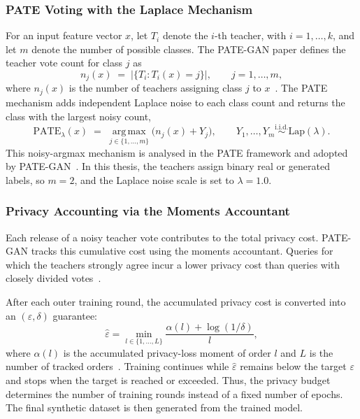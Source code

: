 \subsubsection{PATE Voting with the Laplace Mechanism}
\label{sec:methods:pategan:laplace}

For an input feature vector $x$, let $T_i$ denote the $i$-th teacher,
with $i=1,\dots,k$, and let $m$ denote the number of possible classes.
The PATE-GAN paper defines the teacher vote count for class $j$ as
\begin{equation}
  n_j(x) \;=\; \bigl|\{T_i : T_i(x) = j\}\bigr|,
  \qquad j = 1,\dots,m,
\end{equation}
where $n_j(x)$ is the number of teachers assigning class $j$ to
$x$~\cite{pategan}. The PATE mechanism adds independent Laplace noise to each class count and
returns the class with the largest noisy count,
\begin{equation}
  \mathrm{PATE}_{\lambda}(x)
  \;=\;
  \operatorname*{arg\,max}_{j \in \{1,\dots,m\}}
  \bigl(n_j(x) + Y_j\bigr),
  \qquad
  Y_1,\dots,Y_m \overset{\mathrm{i.i.d.}}{\sim} \mathrm{Lap}(\lambda).
  \label{eq:pategan-aggregation}
\end{equation}
This noisy-argmax mechanism is analysed in the PATE framework and adopted
by PATE-GAN~\cite{Papernot2017PATE,pategan}. In this thesis, the teachers
assign binary real or generated labels, so $m=2$, and the Laplace noise
scale is set to $\lambda=1.0$.

\subsubsection{Privacy Accounting via the Moments Accountant}
\label{sec:methods:pategan:accountant}

Each release of a noisy teacher vote contributes to the total privacy cost.
PATE-GAN tracks this cumulative cost using the moments accountant. 
Queries for which the teachers strongly agree incur a lower
privacy cost than queries with closely divided votes~\cite{pategan}.

After each outer training round, the accumulated privacy cost is converted
into an $(\varepsilon,\delta)$ guarantee:
\begin{equation}
  \hat{\varepsilon}
  =
  \min_{l \in \{1,\dots,L\}}
  \frac{\alpha(l)+\log(1/\delta)}{l},
  \label{eq:pategan-epshat}
\end{equation}
where $\alpha(l)$ is the accumulated privacy-loss moment of order $l$ and
$L$ is the number of tracked orders~\cite{pategan}. Training continues while
$\hat{\varepsilon}$ remains below the target $\varepsilon$ and stops when
the target is reached or exceeded. Thus, the privacy budget determines the
number of training rounds instead of a fixed number of epochs. The final
synthetic dataset is then generated from the trained model.


